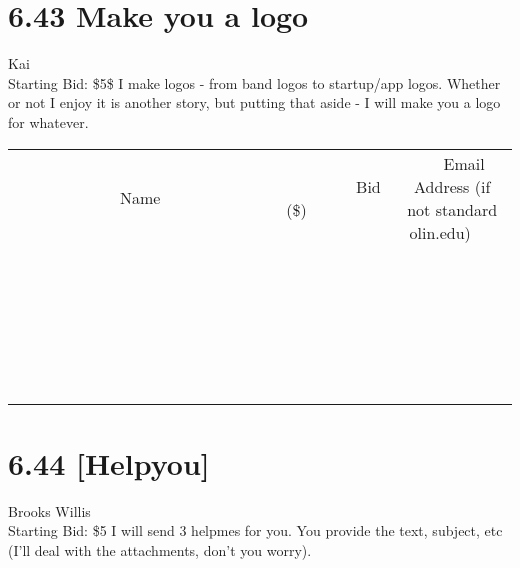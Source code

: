 \documentclass[11pt]{article}
\begin{document}
\section*{6.43 Make you a logo}
Kai
\\
Starting Bid: \$5\$
\newline
I make logos - from band logos to startup/app logos. Whether or not I enjoy it is another story, but putting that aside - I will make you a logo for whatever.
\\[6ex]
\begin{tabular}{c c c}
~~~~~~~~~~~~~Name~~~~~~~~~~~~~ & ~~~~~~~~~Bid (\$)~~~~~~~~~  & ~~~Email Address (if not standard olin.edu)~~~\\
 & & \\
\hline
 & & \\
\hline
 & & \\
\hline
 & & \\
\hline
 & & \\
\hline
 & & \\
\hline
 & & \\
\hline
 & & \\
\hline
 & & \\
\hline
 & & \\
\hline
 & & \\
\hline
 & & \\
\hline
 & & \\
\hline
 & & \\
\hline
 & & \\
\hline
 & & \\
\hline
 & & \\
\hline
 & & \\
\hline
 & & \\
\hline
 & & \\
\hline
 & & \\
\hline
 & & \\
\hline
 & & \\
\hline
 & & \\
\hline
 & & \\
\hline
 & & \\
\hline
\end{tabular}
\newpage
\section*{6.44 [Helpyou]}
Brooks Willis
\\
Starting Bid: \$5
\newline
I will send 3 helpmes for you. You provide the text, subject, etc (I'll deal with the attachments, don't you worry). 
\end{document}
